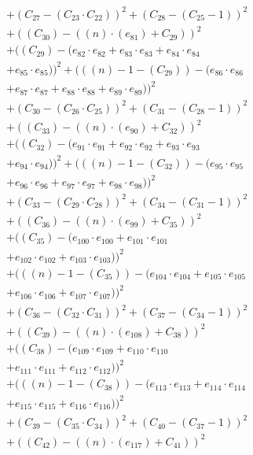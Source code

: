 \documentclass[10pt, a4paper]{article}
\begin{document}
\begin{align*}
& + (C_{27} - (C_{23}  \cdot  C_{22}))^{2} + (C_{28} - (C_{25} - 1))^{2} \\
& + ((C_{30}) - ((n)  \cdot  (e_{81}) + C_{29}))^{2} \\
& + ((C_{29}) - (e_{82} \cdot e_{82} + e_{83} \cdot e_{83} + e_{84} \cdot e_{84} \\
& + e_{85} \cdot e_{85}))^{2} + (((n) - 1 - (C_{29})) - (e_{86} \cdot e_{86} \\
& + e_{87} \cdot e_{87} + e_{88} \cdot e_{88} + e_{89} \cdot e_{89}))^{2} \\
& + (C_{30} - (C_{26}  \cdot  C_{25}))^{2} + (C_{31} - (C_{28} - 1))^{2} \\
& + ((C_{33}) - ((n)  \cdot  (e_{90}) + C_{32}))^{2} \\
& + ((C_{32}) - (e_{91} \cdot e_{91} + e_{92} \cdot e_{92} + e_{93} \cdot e_{93} \\
& + e_{94} \cdot e_{94}))^{2} + (((n) - 1 - (C_{32})) - (e_{95} \cdot e_{95} \\
& + e_{96} \cdot e_{96} + e_{97} \cdot e_{97} + e_{98} \cdot e_{98}))^{2} \\
& + (C_{33} - (C_{29}  \cdot  C_{28}))^{2} + (C_{34} - (C_{31} - 1))^{2} \\
& + ((C_{36}) - ((n)  \cdot  (e_{99}) + C_{35}))^{2} \\
& + ((C_{35}) - (e_{100} \cdot e_{100} + e_{101} \cdot e_{101} \\
& + e_{102} \cdot e_{102} + e_{103} \cdot e_{103}))^{2} \\
& + (((n) - 1 - (C_{35})) - (e_{104} \cdot e_{104} + e_{105} \cdot e_{105} \\
& + e_{106} \cdot e_{106} + e_{107} \cdot e_{107}))^{2} \\
& + (C_{36} - (C_{32}  \cdot  C_{31}))^{2} + (C_{37} - (C_{34} - 1))^{2} \\
& + ((C_{39}) - ((n)  \cdot  (e_{108}) + C_{38}))^{2} \\
& + ((C_{38}) - (e_{109} \cdot e_{109} + e_{110} \cdot e_{110} \\
& + e_{111} \cdot e_{111} + e_{112} \cdot e_{112}))^{2} \\
& + (((n) - 1 - (C_{38})) - (e_{113} \cdot e_{113} + e_{114} \cdot e_{114} \\
& + e_{115} \cdot e_{115} + e_{116} \cdot e_{116}))^{2} \\
& + (C_{39} - (C_{35}  \cdot  C_{34}))^{2} + (C_{40} - (C_{37} - 1))^{2} \\
& + ((C_{42}) - ((n)  \cdot  (e_{117}) + C_{41}))^{2} \\

\end{align*}
\end{document}
